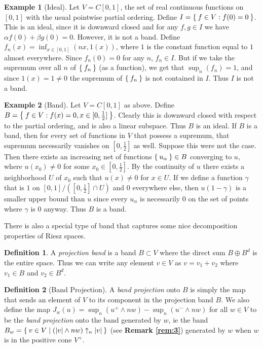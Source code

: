 \documentclass[letterpaper,10pt,oneside,onecolumn,reqno]{amsart}
\theoremstyle{definition}
\newtheorem{defn}{Definition}
\newtheorem{exa}{Example}
\newcommand{\meet}{\wedge}
\begin{document}
\begin{exa}[Ideal]\label{exa:1}
  Let $V=C[0,1]$, the set of real continuous functions on $[0,1]$ with
  the usual pointwise partial ordering. Define $I = \Set{f \in V :
    f(0) = 0}$. This is an ideal, since it is downward closed and for
  any $f,g \in I$ we have $\alpha f(0) + \beta g(0) = 0$. However, it
  is not a band. Define $f_n(x) = \inf_{x \in [0,1]}(nx, 1(x))$, where
  $1$ is the constant function equal to $1$ almost everywhere. Since
  $f_n(0) = 0$ for any $n$, $f_n \in I$. But if we take the supremum
  over all $n$ of $\Set{f_n}$ (as a function), we get that
  $\sup_n({f_n}) = 1$, and since $1(x) = 1 \neq 0$ the supremum of
  $\Set{f_n}$ is not contained in $I$. Thus $I$ is not a band.
\end{exa}

\begin{exa}[Band]\label{exa:2}
  Let $V=C[0,1]$ as above. Define $B = \Set{f \in V : f(x) = 0, x \in
    [0, \frac{1}{2}]}$. Clearly this is downward closed with respect
  to the partial ordering, and is also a linear subspace. Thus $B$ is
  an ideal. If $B$ is a band, then for every set of functions in $V$
  that possess a supremum, that supremum necessarily vanishes on
  $[0,\frac{1}{2}]$ as well. Suppose this were not the case. Then
  there exists an increasing net of functions $\Set{u_{\alpha}} \in B$
  converging to $u$, where $u(x_{0}) \neq 0 $ for some $x_0 \in
  [0,\frac{1}{2}]$. By the continuity of $u$ there exists a
  neighborhood $U$ of $x_0$ such that $u(x) \neq 0$ for $x \in U$. If
  we define a function $\gamma$ that is $1$ on $[0,1]/([0,\frac{1}{2}]
  \cap U)$ and $0$ everywhere else, then $u(1 - \gamma)$ is a smaller
  upper bound than $u$ since every $u_{\alpha}$ is necessarily $0$ on
  the set of points where $\gamma$ is $0$ anyway. Thus $B$ is a band.
\end{exa}

There is also a special type of band that captures some nice
decomposition properties of Riesz spaces.

\begin{defn}
  \label{def:16}
  A \emph{projection band} is a band $B \subset
  V$ where the direct sum $B \oplus B^d$ is the entire space. Thus we
  can write any element $v \in V$ as $v = v_1 + v_2$ where $v_1 \in B$
  and $v_2 \in B^d$.
\end{defn}

\begin{defn}[Band Projection]\label{def:11}
  A \emph{band projection} onto $B$ is simply
  the map that sends an element of $V$ to its component in the
  projection band $B$. We also define the map $J_w(u) = \sup_n (u^+
  \meet nw) - \sup_n(u^- \meet nw)$ for all $w \in V$ to be the
  \emph{band projection} onto the band generated by $w$, ie the band
  $B_w = \Set{v \in V | (|v| \meet nw) \uparrow_n |v|}$ (see
  \textbf{Remark \ref{rem:3}}) generated by $w$ when $w$ is in the
  positive cone $V^+$.
\end{defn}
\end{document}
